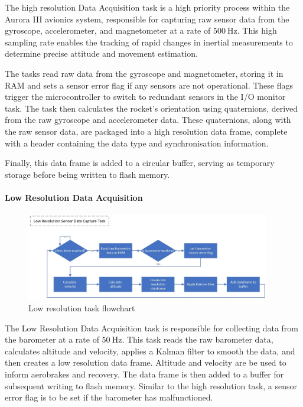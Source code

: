 The high resolution Data Acquisition task is a high priority process within the Aurora III avionics system, responsible for capturing raw sensor data from the gyroscope, accelerometer, and magnetometer at a rate of $\SI{500}{\hertz}$. This high sampling rate enables the tracking of rapid changes in inertial measurements to determine precise attitude and movement estimation. 

The tasks read raw data from the gyroscope and magnetometer, storing it in RAM and sets a sensor error flag if any sensors are not operational. These flags trigger the microcontroller to switch to redundant sensors in the I/O monitor task. The task then calculates the rocket's orientation using quaternions, derived from the raw gyroscope and accelerometer data. These quaternions, along with the raw sensor data, are packaged into a high resolution data frame, complete with a header containing the data type and synchronisation information. 

Finally, this data frame is added to a circular buffer, serving as temporary storage before being written to flash memory.  

 
\paragraph{Low Resolution Data Acquisition}
\begin{figure}[ht!]
  \begin{center}
    \includegraphics[width=0.95\textwidth]{./img/Section_4_2_2_2.jpeg}
  \end{center}
  \caption{Low resolution task flowchart}\label{fig:flowchart-low_res}
\end{figure}

The Low Resolution Data Acquisition task is responsible for collecting data from the barometer at a rate of $\SI{50}{\hertz}$. This task reads the raw barometer data, calculates altitude and velocity, applies a Kalman filter to smooth the data, and then creates a low resolution data frame. Altitude and velocity are be used to inform aerobrakes and recovery. The data frame is then added to a buffer for subsequent writing to flash memory. Similar to the high resolution task, a sensor error flag is to be set if the barometer has malfunctioned.  

